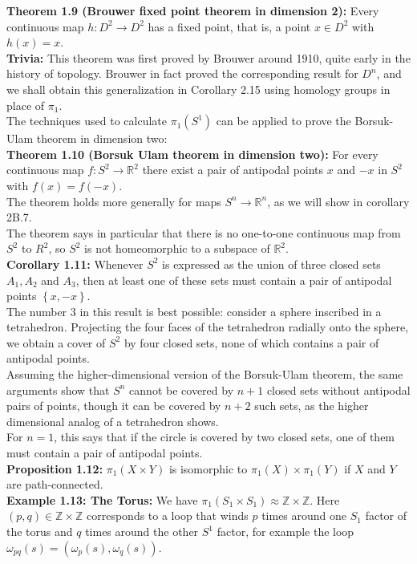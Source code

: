 \documentclass[a4paper]{article}
\begin{document}
\textbf{Theorem 1.9 (Brouwer fixed point theorem in dimension 2):} Every
continuous map $h  \colon D^2 \to D^2$ has a fixed point, that is, a point 
$x \in D^2$ with $h (x) = x$.\\
\linebreak
\textbf{Trivia:} This theorem was first proved by Brouwer around 1910, quite
early in the history of topology. Brouwer in fact proved the corresponding
result for $D^{n}$, and we shall obtain this generalization in Corollary 2.15
using homology groups in place of $\pi_1$.\\
\linebreak
The techniques used to calculate $\pi_1 (S^{1})$ can be applied to prove the
Borsuk-Ulam theorem in dimension two:\\
\linebreak
\textbf{Theorem 1.10 (Borsuk Ulam theorem in dimension two):} For every
continuous map $f \colon S^2 \to \mathbb{R}^2$ there exist a pair of antipodal
points $x$ and $-x$ in $S^2$ with $f(x) = f(-x)$.\\
\linebreak
The theorem holds more generally for maps $S^{n} \to \mathbb{R}^{n}$, as we
will show in corollary 2B.7.\\
The theorem says in particular that there is no one-to-one continuous map from
$S^2$ to $R^2$, so $S^2$ is not homeomorphic to a subspace of $\mathbb{R}^2$.\\
\linebreak
\textbf{Corollary 1.11:} Whenever $S^2$ is expressed as the union of three
closed sets $A_1, A_2$ and $A_3$, then at least one of these sets must contain
a pair of antipodal points $\left\{ x, -x \right\} $.\\
\linebreak
The number $3$ in this result is best possible: consider a sphere inscribed in
a tetrahedron. Projecting the four faces of the tetrahedron radially onto the
sphere, we obtain a cover of $S^2$ by four closed sets, none of which contains
a pair of antipodal points.\\
Assuming the higher-dimensional version of the Borsuk-Ulam theorem, the same
arguments show that $S^{n}$ cannot be covered by $n+1$ closed sets without
antipodal pairs of points, though it can be covered by $n+2$ such sets, as the
higher dimensional analog of a tetrahedron shows.\\
For $n=1$, this says that if the circle is covered by two closed sets, one of
them must contain a pair of antipodal points.\\
\linebreak
\textbf{Proposition 1.12:} $\pi_1 \left( X\times Y \right) $ is isomorphic to
$\pi_1 (X) \times \pi_1 (Y)$ if $X$ and $Y$ are path-connected.\\
\linebreak
{}
\textbf{Example 1.13: The Torus:} We have $\pi_1 \left( S_1 \times S_1 \right)
\approx \mathbb{Z} \times \mathbb{Z}$. Here $(p, q) \in \mathbb{Z}\times
\mathbb{Z}$ corresponds to a loop that winds $p$ times around one $S_1$ factor
of the torus and $q$ times around the other $S^{1}$ factor, for example the
loop
$\omega_{pq} (s) = \left( \omega_p (s), \omega_q (s) \right) $.
\end{document}

